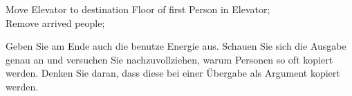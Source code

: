 \documentclass[
  accentcolor=tud1c,	%
  colorbacktitle,		%
  inverttitle,			%
  german,				%
  twoside
]{tudexercise}
\begin{document}
\begin{enumerate}
\begin{algorithm}[H]
{   {
    Move Elevator to destination Floor of first Person in Elevator; \\
    Remove arrived people; \\
  }
 }
\end{algorithm}

Geben Sie am Ende auch die benutze Energie aus. Schauen Sie sich die Ausgabe genau an und versuchen Sie nachzuvollziehen, warum Personen so oft kopiert werden. Denken Sie daran, dass diese bei einer Übergabe als Argument kopiert werden. \\\\

\end{enumerate}
\end{document}

